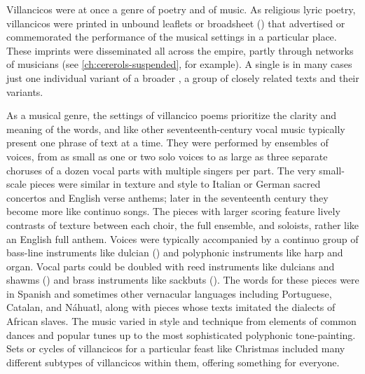 Villancicos were at once a genre of poetry and of music.
As religious lyric poetry, villancicos were printed in unbound leaflets or
broadsheet () that advertised or commemorated the
performance of the musical settings in a particular place.%
    \Autocites
    {LopezLorenzo:VC-Sevillano}
    {BNE:VCs17C}
These imprints were disseminated all across the empire, partly through networks
of musicians (see \cref{ch:cererols-suspended}, for example).
A single  is in many cases just one individual variant of
a broader , a group of closely related texts and their
variants.

As a musical genre, the settings of villancico poems prioritize the clarity and
meaning of the words, and like other seventeenth-century vocal music typically
present one phrase of text at a time.
They were performed by ensembles of voices, from as small as one or two solo
voices to as large as three separate choruses of a dozen vocal parts with
multiple singers per part.
The very small-scale pieces were similar in texture and style to Italian or
German sacred concertos and English verse anthems; later in the seventeenth
century they become more like continuo songs.%
    \Autocite{Kendrick:SacredSongs}
The pieces with larger scoring feature lively contrasts of texture between each
choir, the full ensemble, and soloists, rather like an English full anthem.
Voices were typically accompanied by a continuo group of bass-line instruments
like dulcian () and polyphonic instruments like harp and organ.
Vocal parts could be doubled with reed instruments like dulcians and shawms
() and brass instruments like sackbuts ().%
The words for these pieces were in Spanish and sometimes other vernacular
languages including Portuguese, Catalan, and Náhuatl, along with pieces whose
texts imitated the dialects of African slaves.
The music varied in style and technique from elements of common dances
and popular tunes up to the most sophisticated polyphonic tone-painting.
Sets or cycles of villancicos for a particular feast like Christmas included
many different subtypes of villancicos within them, offering something for
everyone.

